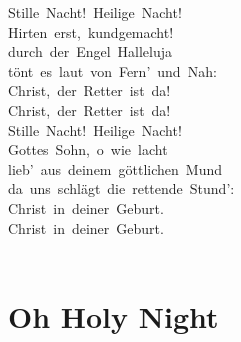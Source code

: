 \documentclass[]{book}
\let\stdsection\section
\renewcommand\section{\clearpage\stdsection}
\begin{document}
Stille~Nacht!~Heilige~Nacht!\\
Hirten~erst,~kundgemacht!\\
durch~der~Engel~Halleluja\\
tönt~es~laut~von~Fern'~und~Nah:\\
Christ,~der~Retter~ist~da!\\
Christ,~der~Retter~ist~da!\\
Stille~Nacht!~Heilige~Nacht!\\
Gottes~Sohn,~o~wie~lacht\\
lieb'~aus~deinem~göttlichen~Mund\\
da~uns~schlägt~die~rettende~Stund':\\
Christ~in~deiner~Geburt.\\
Christ~in~deiner~Geburt.\\
~\\

\hypertarget{oh-holy-night}{%
\section{Oh Holy Night}\label{oh-holy-night}}
\end{document}
